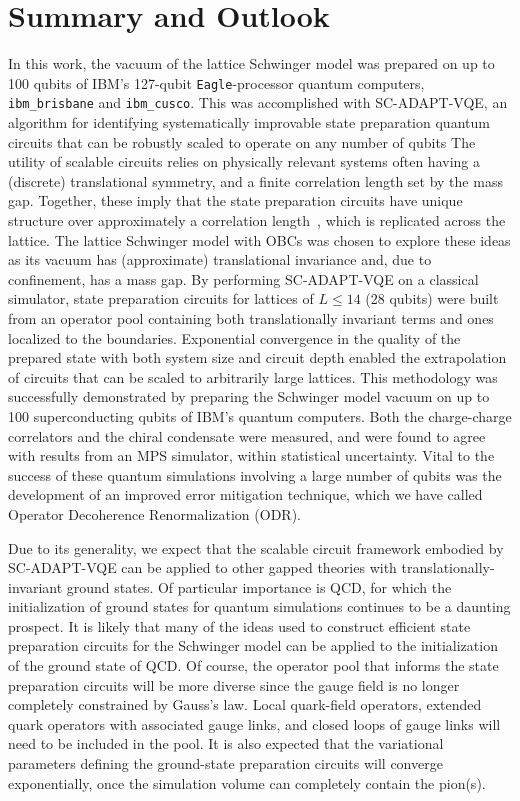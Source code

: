 \documentclass[aps, pra, onecolumn, tightenlines, letterpaper, amsmath, amssymb, preprintnumbers, floatfix, longbibliography, nofootinbib]{revtex4-2}
\begin{document}
\section{Summary and Outlook}
\label{sec:Conclusions}
\noindent
In this work, the vacuum of the lattice Schwinger model was prepared 
on up to 100 qubits of IBM's 
127-qubit {\tt Eagle}-processor quantum computers,
{\tt ibm\_brisbane} and {\tt ibm\_cusco}.
This was accomplished with SC-ADAPT-VQE, an algorithm for identifying systematically improvable
state preparation quantum circuits that can be robustly scaled to operate on any number of qubits
The utility of scalable circuits relies on physically relevant systems often having a (discrete) translational symmetry, and a finite correlation length set by the mass gap.
Together, these imply that the state preparation circuits have unique structure over approximately a correlation length~\cite{Klco:2019yrb,Klco:2020aud},
which is replicated across the lattice.
The lattice Schwinger model with OBCs was chosen to explore these ideas as its vacuum has (approximate) translational invariance and, due to confinement, has a mass gap.
By performing SC-ADAPT-VQE on a classical simulator, state preparation circuits for lattices of $L\leq 14$ (28 qubits) were built from an operator pool containing both translationally invariant terms and ones localized to the boundaries.
Exponential convergence in the quality of the prepared state with both system size and circuit depth enabled the extrapolation of circuits that can be scaled to arbitrarily large lattices.
This methodology was successfully demonstrated by preparing the Schwinger model vacuum on up to 100 superconducting qubits of IBM's quantum computers.
Both the charge-charge correlators and the chiral condensate were measured, and were found to agree with results from an MPS simulator, within statistical uncertainty.
Vital to the success of these quantum simulations involving a large number of qubits was the development of an improved error mitigation technique, which we have called Operator Decoherence Renormalization (ODR).


Due to its generality, 
we expect that the scalable circuit framework embodied by SC-ADAPT-VQE can be applied to other gapped theories with translationally-invariant ground states.
Of particular importance is QCD,  
for which the initialization of ground states for quantum simulations continues to be a daunting prospect.
It is likely that many of the ideas used to construct efficient state preparation circuits for the Schwinger model can be applied to the initialization of the ground state of QCD.
Of course, the operator pool that informs the state preparation circuits will be  
more diverse since the  gauge field is no longer completely constrained by Gauss's law.
Local quark-field operators, extended quark operators with associated gauge links, and closed loops of gauge links will need to be included in the pool.
It is also expected that the variational parameters defining the 
ground-state preparation circuits will converge exponentially, 
once the simulation volume can completely contain the pion(s). 
\end{document}
